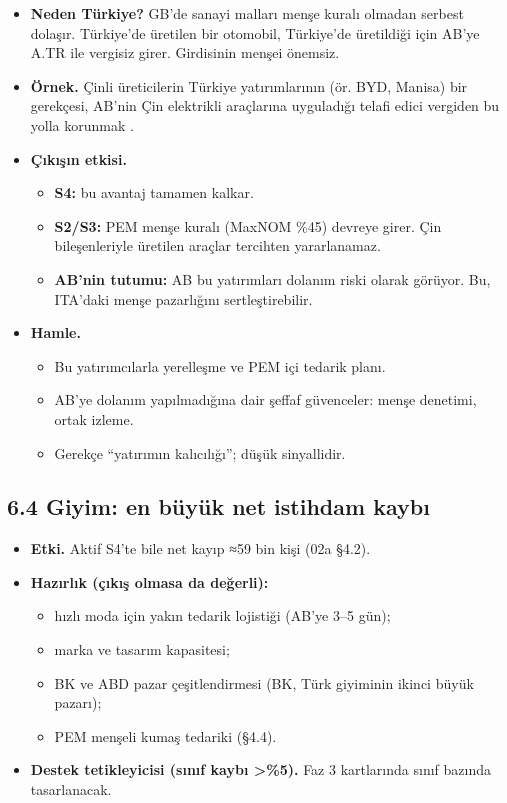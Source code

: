 \begin{itemize}
\tightlist
\item
  \textbf{Neden Türkiye?} GB'de sanayi malları menşe kuralı olmadan serbest dolaşır. Türkiye'de üretilen bir otomobil, Türkiye'de üretildiği için AB'ye A.TR ile vergisiz girer. Girdisinin menşei önemsiz.
\item
  \textbf{Örnek.} Çinli üreticilerin Türkiye yatırımlarının (ör. BYD, Manisa) bir gerekçesi, AB'nin Çin elektrikli araçlarına uyguladığı telafi edici vergiden bu yolla korunmak \etiketD{}.
\item
  \textbf{Çıkışın etkisi.}

  \begin{itemize}
  \tightlist
  \item
    \textbf{S4:} bu avantaj tamamen kalkar.
  \item
    \textbf{S2/S3:} PEM menşe kuralı (MaxNOM \%45) devreye girer. Çin bileşenleriyle üretilen araçlar tercihten yararlanamaz.
  \item
    \textbf{AB'nin tutumu:} AB bu yatırımları dolanım riski olarak görüyor. Bu, ITA'daki menşe pazarlığını sertleştirebilir.
  \end{itemize}
\item
  \textbf{Hamle.}

  \begin{itemize}
  \tightlist
  \item
    Bu yatırımcılarla yerelleşme ve PEM içi tedarik planı.
  \item
    AB'ye dolanım yapılmadığına dair şeffaf güvenceler: menşe denetimi, ortak izleme.
  \item
    Gerekçe ``yatırımın kalıcılığı''; düşük sinyallidir.
  \end{itemize}
\end{itemize}

\hypertarget{02c_hazirlik-64-giyim-en-buxfcyuxfck-net-istihdam-kaybux131}{%
\subsection{6.4 Giyim: en büyük net istihdam kaybı}\label{02c_hazirlik-64-giyim-en-buxfcyuxfck-net-istihdam-kaybux131}}

\begin{itemize}
\tightlist
\item
  \textbf{Etki.} Aktif S4'te bile net kayıp ≈59 bin kişi (02a §4.2).
\item
  \textbf{Hazırlık (çıkış olmasa da değerli):}

  \begin{itemize}
  \tightlist
  \item
    hızlı moda için yakın tedarik lojistiği (AB'ye 3--5 gün);
  \item
    marka ve tasarım kapasitesi;
  \item
    BK ve ABD pazar çeşitlendirmesi (BK, Türk giyiminin ikinci büyük pazarı);
  \item
    PEM menşeli kumaş tedariki (§4.4).
  \end{itemize}
\item
  \textbf{Destek tetikleyicisi (sınıf kaybı \textgreater\%5).} Faz 3 kartlarında sınıf bazında tasarlanacak.
\end{itemize}

